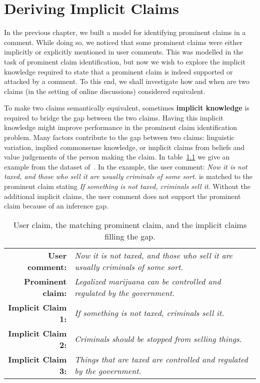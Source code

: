 \chapter{Deriving Implicit Claims}
\label{chap:deriving_implicit}

In the previous chapter, we built a model for identifying 
prominent claims in a comment. While doing so, we noticed that 
some prominent claims were either implicitly or explicitly mentioned
in user comments. This was modelled in the task of prominent claim
identification, but now we wish to explore the implicit knowledge required
to state that a prominent claim is indeed supported or attacked by a comment.
To this end, we shall investigate how and when are two claims
(in the setting of online discussions) considered equivalent. 

To make two claims semantically equivalent, sometimes \textbf{implicit knowledge} is
required to bridge the gap between the two claims. 
Having this implicit knowledge might improve performance in the 
prominent claim identification problem. 
Many factors contribute to the gap between two claims: linguistic variation,
implied commonsense knowledge, or implicit claims from beliefs and value
judgements of the person making the claim. In table~\ref{tab:premise_example} we
give an example from the dataset of~\citet{hasan2014you}. 
In the example, the user comment: 
\emph{Now it is not taxed, and those who sell it are usually criminals of some sort.}
is matched to  the prominent claim stating
\emph{If something is not taxed, criminals sell it}.
Without the additional implicit claims, the user comment does not support the prominent 
claim because of an inference gap. 

\begin{table}
{\normalsize
\begin{tabular}{|@{\ }r@{\ \  }p{}|}
\hline
\textbf{User comment:} & \emph{Now it is not taxed, and those who sell it are
	usually criminals of some sort.}\\
\textbf{Prominent claim:} & \emph{Legalized marijuana can be controlled and
	regulated by the government.}\\
\textbf{Implicit Claim 1:} & \emph{If something is not taxed, criminals sell
	it.}\\
\textbf{Implicit Claim 2:} & \emph{Criminals should be stopped from selling
	things.}\\
\textbf{Implicit Claim 3:} & \emph{Things that are taxed are controlled and
	regulated by the government.}\\
\hline
\end{tabular}}
\caption{User claim, the matching prominent claim, and the implicit claims filling the gap.}
\label{tab:premise_example}
\end{table}

